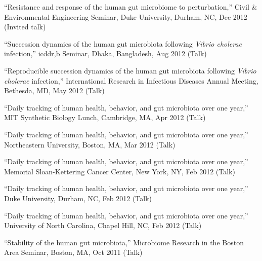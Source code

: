 \documentclass[overlapped,line,11pt]{res}
\begin{document}
\begin{resume}
\begin{revnumerate}[39]
\item {``Resistance and response of the human gut microbiome to
  perturbation,'' Civil \& Environmental Engineering Seminar, Duke University,
  Durham, NC, Dec 2012 (Invited talk)}\vspace*{0mm}

\item {``Succession dynamics of the human gut microbiota
  following \emph{Vibrio cholerae} infection,'' icddr,b Seminar, Dhaka,
  Bangladesh, Aug 2012 (Talk)}
\vspace*{0mm}

\item {``Reproducible succession dynamics of the human gut microbiota
  following \emph{Vibrio cholerae} infection,'' International Research in
  Infectious Diseases Annual Meeting, Bethesda, MD, May 2012 (Talk)}
\vspace*{0mm}

\item {``Daily tracking of human health, behavior, and gut microbiota
  over one year,'' MIT Synthetic Biology Lunch, Cambridge, MA, Apr 2012 (Talk)}
\vspace*{0mm}

\item {``Daily tracking of human health, behavior, and gut microbiota
  over one year,'' Northeastern University, Boston, MA, Mar 2012 (Talk)}
\vspace*{0mm}

\item {``Daily tracking of human health, behavior, and gut microbiota
  over one year,'' Memorial Sloan-Kettering Cancer Center, New York, NY,
  Feb 2012 (Talk)}
\vspace*{0mm}

\item {``Daily tracking of human health, behavior, and gut microbiota
  over one year,'' Duke University, Durham, NC, Feb 2012 (Talk)}
\vspace*{0mm}

\item {``Daily tracking of human health, behavior, and gut microbiota
  over one year,'' University of North Carolina, Chapel Hill, NC, Feb 2012 (Talk)}
\vspace*{0mm}

\item {``Stability of the human gut microbiota,'' Microbiome Research
  in the Boston Area Seminar, Boston, MA, Oct 2011 (Talk)}
\vspace*{0mm}


\end{revnumerate}
\end{resume}
\end{document}
